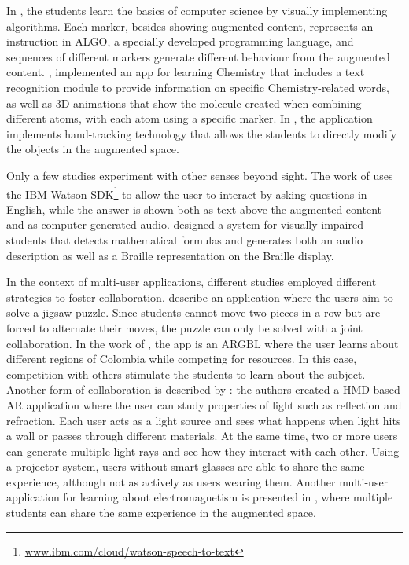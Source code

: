In \cite{gardeli2018effect}, the students learn the basics of computer science by visually implementing algorithms. Each marker, besides showing augmented content, represents an instruction in ALGO, a specially developed programming language, and sequences of different markers generate different behaviour from the augmented content. \cite{241-MACARIU20202133}, implemented an app for learning Chemistry that includes a text recognition module to provide information on specific Chemistry-related words, as well as 3D animations that show the molecule created when combining different atoms, with each atom using a specific marker. In \cite{logothetis2021transforming}, the application implements hand-tracking technology that allows the students to directly modify the objects in the augmented space.

Only a few studies experiment with other senses beyond sight. The work of \cite{kenoui2020teach} uses the IBM Watson SDK\footnote{\url{www.ibm.com/cloud/watson-speech-to-text}} to allow the user to interact by asking questions in English, while the answer is shown both as text above the augmented content and as computer-generated audio. \cite{mikulowski2020multi} designed a system for visually impaired students that detects mathematical formulas and generates both an audio description as well as a Braille representation on the Braille display.
 
In the context of multi-user applications, different studies employed different strategies to foster collaboration. \cite{boonbrahm2016interactive} describe an application where the users aim to solve a jigsaw puzzle. Since students cannot move two pieces in a row but are forced to alternate their moves, the puzzle can only be solved with a joint collaboration. In the work of  \cite{ortiz2018evaluation}, the app is an \gls{ARGBL} where the user learns about different regions of Colombia while competing for resources. In this case, competition with others stimulate the students to learn about the subject. Another form of collaboration is described by \cite{oh2016designing}: the authors created a HMD-based AR application where the user can study properties of light such as reflection and refraction. Each user acts as a light source and sees what happens when light hits a wall or passes through different materials. At the same time, two or more users can generate multiple light rays and see how they interact with each other. Using a projector system, users without smart glasses are able to share the same experience, although not as actively as users wearing them. Another multi-user application for learning about electromagnetism is presented in \cite{radu2022augmented}, where multiple students can share the same experience in the augmented space.

